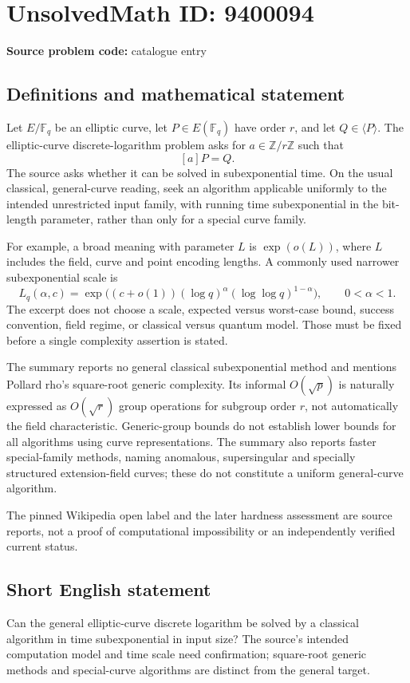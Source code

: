 \documentclass[11pt]{article}
\begin{document}
\section*{UnsolvedMath ID: 9400094}
\textbf{Source problem code:} catalogue entry
\subsection{Definitions and mathematical statement}
Let \(E/\mathbb F_q\) be an elliptic curve, let \(P\in E(\mathbb F_q)\) have order \(r\), and let \(Q\in\langle P\rangle\). The elliptic-curve discrete-logarithm problem asks for \(a\in\mathbb Z/r\mathbb Z\) such that
\[
 [a]P=Q.
\]
The source asks whether it can be solved in subexponential time. On the usual classical, general-curve reading, seek an algorithm applicable uniformly to the intended unrestricted input family, with running time subexponential in the bit-length parameter, rather than only for a special curve family.

For example, a broad meaning with parameter \(L\) is \(\exp(o(L))\), where \(L\) includes the field, curve and point encoding lengths. A commonly used narrower subexponential scale is
\[
 L_q(\alpha,c)=\exp\bigl((c+o(1))(\log q)^\alpha(\log\log q)^{1-\alpha}\bigr),
 \qquad0<\alpha<1.
\]
The excerpt does not choose a scale, expected versus worst-case bound, success convention, field regime, or classical versus quantum model. Those must be fixed before a single complexity assertion is stated.

The summary reports no general classical subexponential method and mentions Pollard rho's square-root generic complexity. Its informal \(O(\sqrt p)\) is naturally expressed as \(O(\sqrt r)\) group operations for subgroup order \(r\), not automatically the field characteristic. Generic-group bounds do not establish lower bounds for all algorithms using curve representations. The summary also reports faster special-family methods, naming anomalous, supersingular and specially structured extension-field curves; these do not constitute a uniform general-curve algorithm.

The pinned Wikipedia open label and the later hardness assessment are source reports, not a proof of computational impossibility or an independently verified current status.
\subsection{Short English statement}
Can the general elliptic-curve discrete logarithm be solved by a classical algorithm in time subexponential in input size? The source's intended computation model and time scale need confirmation; square-root generic methods and special-curve algorithms are distinct from the general target.
\end{document}
